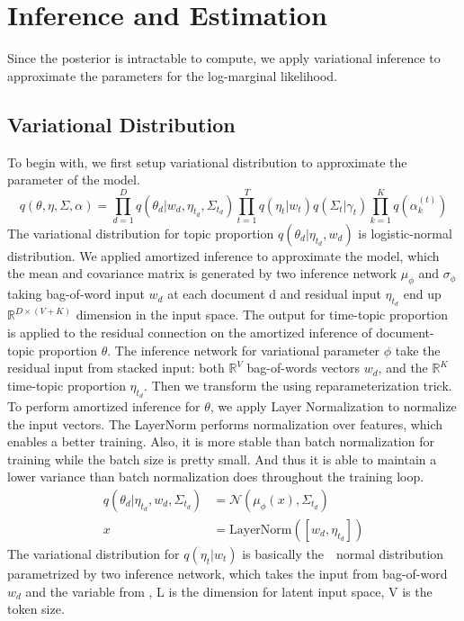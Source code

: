 \section{Inference and Estimation}
Since the posterior is intractable to compute, we apply variational inference to approximate the parameters for the log-marginal likelihood.
\subsection{Variational Distribution}
To begin with, we first setup variational distribution to approximate the parameter of the model. 
\begin{equation}
q(\theta,\eta,\Sigma,\alpha)=\prod_{d=1}^{D}q(\theta_d|w_d,\eta_{t_d},\Sigma_{t_d})\prod_{t=1}^{T}q(\eta_t|w_t)q(\Sigma_{t}|\gamma_{t})\prod_{k=1}^{K}q(\alpha_k^{(t)})
\end{equation}
The variational distribution for topic proportion $ q(\theta_d|\eta_{t_d},w_d) $ is logistic-normal distribution. We applied amortized inference to approximate the model, which the mean and covariance matrix is generated by two inference network $ \mu_\phi $ and $ \sigma_\phi $ taking bag-of-word input $ w_d $ at each document d and residual input $ \eta_{t_d} $ end up $ \mathbb{R}^{D\times (V+K)} $ dimension in the input space.
The output for time-topic proportion is applied to the residual connection on the amortized inference of document-topic proportion $ \theta $. The inference network for variational parameter $ \phi $ take the residual input from stacked input: both $ \mathbb{R}^{V} $ bag-of-words vectors $ w_d $, and the $ \mathbb{R}^{K} $ time-topic proportion $ \eta_{t_d} $.
Then we transform the  using reparameterization trick.
To perform amortized inference for $ \theta $, we apply Layer Normalization\cite{ba_layer_2016} to normalize the input vectors. The LayerNorm performs normalization over features, which enables a better training. Also, it is more stable than batch normalization for training while the batch size is pretty small. And thus it is able to maintain a lower variance than batch normalization does throughout the training loop.
\begin{align}\label{eq:ch5_variational_theta}
q(\theta_d|\eta_{t_d},w_d,\Sigma_{t_d})&=\mathcal{N}(\mu_\phi(x),\Sigma_{t_d})\\
x&=\text{LayerNorm}([w_d,\eta_{t_d}])
\end{align}
The variational distribution for $ q(\eta_t|w_t) $ is basically the　normal distribution parametrized by two inference network, which takes the input from bag-of-word $ w_d $ and the variable from \cite{lawrence_learning_2007}, L is the dimension for latent input space, V is the token size.
